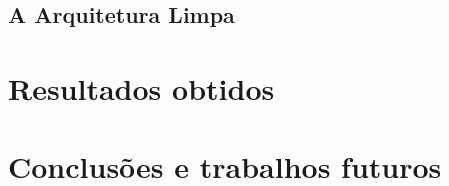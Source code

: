 \documentclass[12pt]{article}
\begin{document}


\subsection{A Arquitetura Limpa}



\section{Resultados obtidos}



\section{Conclusões e trabalhos futuros}



\raggedright


\end{document}
